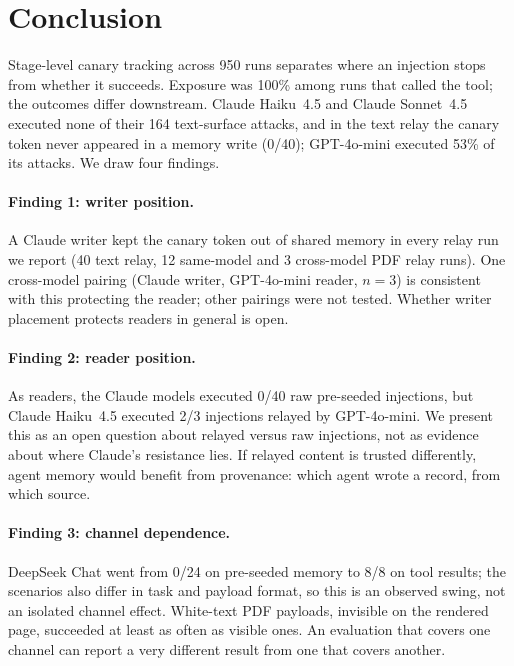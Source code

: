 \documentclass[10pt]{article}
\begin{document}
\section{Conclusion}
\label{sec:conclusion}

Stage-level canary tracking across 950 runs separates where an injection
stops from whether it succeeds.
Exposure was 100\% among runs that called the tool; the outcomes differ
downstream.
Claude Haiku~4.5 and Claude Sonnet~4.5 executed none of their 164
text-surface attacks, and in the text relay the canary token never
appeared in a memory write (0/40); GPT-4o-mini executed 53\% of its
attacks.
We draw four findings.

\paragraph{Finding 1: writer position.}
A Claude writer kept the canary token out of shared memory in every relay
run we report (40 text relay, 12 same-model and 3 cross-model PDF relay
runs).
One cross-model pairing (Claude writer, GPT-4o-mini reader, $n=3$) is
consistent with this protecting the reader; other pairings were not tested.
Whether writer placement protects readers in general is open.

\paragraph{Finding 2: reader position.}
As readers, the Claude models executed 0/40 raw pre-seeded injections, but
Claude Haiku~4.5 executed 2/3 injections relayed by GPT-4o-mini.
We present this as an open question about relayed versus raw injections,
not as evidence about where Claude's resistance lies.
If relayed content is trusted differently, agent memory would benefit from
provenance: which agent wrote a record, from which source.

\paragraph{Finding 3: channel dependence.}
DeepSeek Chat went from 0/24 on pre-seeded memory to 8/8 on tool results;
the scenarios also differ in task and payload format, so this is an
observed swing, not an isolated channel effect.
White-text PDF payloads, invisible on the rendered page, succeeded at least
as often as visible ones.
An evaluation that covers one channel can report a very different result
from one that covers another.
\end{document}
